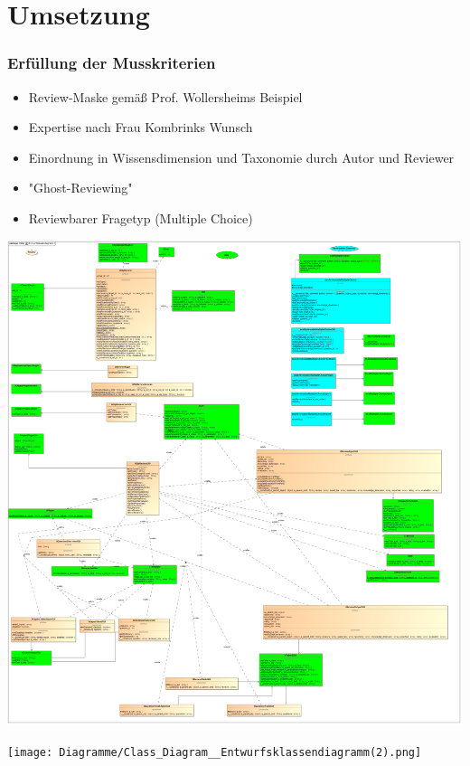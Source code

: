 \documentclass{beamer}
\begin{document}
	\section{Umsetzung}
		\begin{frame}
			\frametitle{Erfüllung der Musskriterien}
			\begin{itemize}
				\item Review-Maske gemäß Prof. Wollersheims Beispiel
				\pause
				\item Expertise nach Frau Kombrinks Wunsch
				\pause
				\item Einordnung in Wissensdimension und Taxonomie durch Autor und Reviewer
				\pause
				\item "Ghost-Reviewing"
				\pause
				\item Reviewbarer Fragetyp (Multiple Choice)
			\end{itemize}
		\end{frame}
		\begin{frame}
			\begin{center}
				\includegraphics[scale=0.08]{Diagramme/Class_Diagram__Entwurfsklassendiagramm.png}
			\end{center}
		\end{frame}
		\begin{frame}
			\begin{center}
				\texttt{[image: Diagramme/Class\_Diagram\_\_Entwurfsklassendiagramm(2).png]}
				\label{Reviewplugin}
			\end{center}
		\end{frame}
\end{document}
